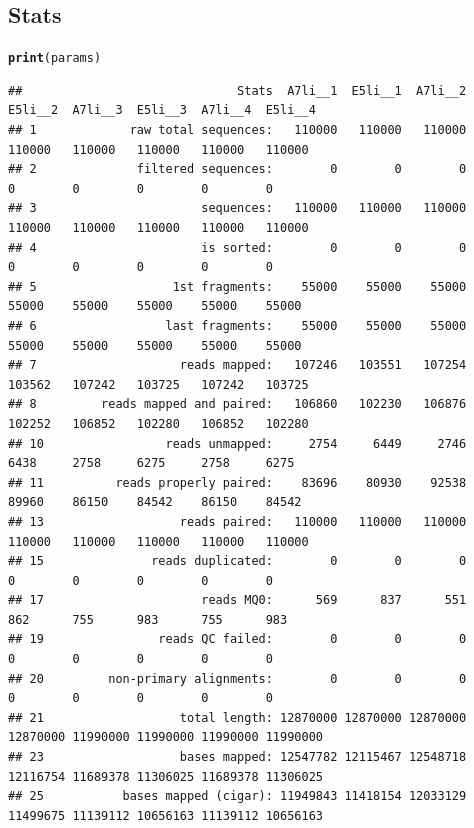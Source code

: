 \documentclass[12pt, a4paper]{article}\usepackage[]{graphicx}\usepackage[]{color}
\makeatletter
\newcommand{\hlstd}[1]{\textcolor[rgb]{0.345,0.345,0.345}{#1}}%
\newcommand{\hlkwd}[1]{\textcolor[rgb]{0.737,0.353,0.396}{\textbf{#1}}}%
\newenvironment{kframe}{%
 \def\at@end@of@kframe{}%
 \ifinner\ifhmode%
  \def\at@end@of@kframe{\end{minipage}}%
  \begin{minipage}{\columnwidth}%
 \fi\fi%
 \def\FrameCommand##1{\hskip\@totalleftmargin \hskip-\fboxsep
 \colorbox{shadecolor}{##1}\hskip-\fboxsep
     \hskip-\linewidth \hskip-\@totalleftmargin \hskip\columnwidth}%
 \MakeFramed {\advance\hsize-\width
   \@totalleftmargin\z@ \linewidth\hsize
   \@setminipage}}%
 {\par\unskip\endMakeFramed%
 \at@end@of@kframe}
\newenvironment{knitrout}{}{} %
\makeatother
\begin{document}
\subsection{Stats}
\begin{knitrout}\tiny
{}\color{fgcolor}\begin{kframe}
\begin{alltt}
\hlkwd{print}\hlstd{(params)}
\end{alltt}
\begin{verbatim}
##                              Stats  A7li__1  E5li__1  A7li__2  E5li__2  A7li__3  E5li__3  A7li__4  E5li__4
## 1             raw total sequences:   110000   110000   110000   110000   110000   110000   110000   110000
## 2              filtered sequences:        0        0        0        0        0        0        0        0
## 3                       sequences:   110000   110000   110000   110000   110000   110000   110000   110000
## 4                       is sorted:        0        0        0        0        0        0        0        0
## 5                   1st fragments:    55000    55000    55000    55000    55000    55000    55000    55000
## 6                  last fragments:    55000    55000    55000    55000    55000    55000    55000    55000
## 7                    reads mapped:   107246   103551   107254   103562   107242   103725   107242   103725
## 8         reads mapped and paired:   106860   102230   106876   102252   106852   102280   106852   102280
## 10                 reads unmapped:     2754     6449     2746     6438     2758     6275     2758     6275
## 11          reads properly paired:    83696    80930    92538    89960    86150    84542    86150    84542
## 13                   reads paired:   110000   110000   110000   110000   110000   110000   110000   110000
## 15               reads duplicated:        0        0        0        0        0        0        0        0
## 17                      reads MQ0:      569      837      551      862      755      983      755      983
## 19                reads QC failed:        0        0        0        0        0        0        0        0
## 20         non-primary alignments:        0        0        0        0        0        0        0        0
## 21                   total length: 12870000 12870000 12870000 12870000 11990000 11990000 11990000 11990000
## 23                   bases mapped: 12547782 12115467 12548718 12116754 11689378 11306025 11689378 11306025
## 25           bases mapped (cigar): 11949843 11418154 12033129 11499675 11139112 10656163 11139112 10656163

\end{verbatim}
\end{kframe}
\end{knitrout}
\end{document}
